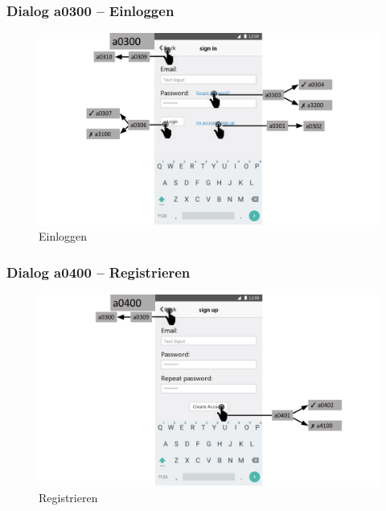 \documentclass[a4paper,12pt,oneside]{scrartcl}
\begin{document}
\subsubsection{Dialog a0300 – Einloggen}
\begin{figure}[!htbp]
\centering
\noindent\includegraphics[width=\linewidth,height=\textheight,keepaspectratio]{Dialoge/a0300}
\caption{Einloggen}
\end{figure}
\FloatBarrier

\subsubsection{Dialog a0400 – Registrieren}
\begin{figure}[!htbp]
\centering
\noindent\includegraphics[width=\linewidth,height=\textheight,keepaspectratio]{Dialoge/a0400}
\caption{Registrieren}
\end{figure}
\FloatBarrier
\end{document}
